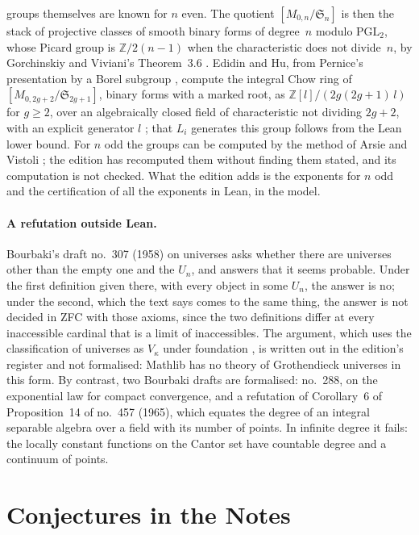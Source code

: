\documentclass[runningheads,a4paper]{llncs}
\begin{document}
groups themselves are known for $n$ even. The quotient $[M_{0,n}/\mathfrak S_n]$ is then the stack of projective classes of smooth binary forms of degree~$n$ modulo $\mathrm{PGL}_2$, whose Picard group is $\mathbb Z/2(n-1)$ when the characteristic does not divide~$n$, by Gorchinskiy and Viviani's Theorem~3.6 \cite{gorchinskiyviviani2008}. Edidin and Hu, from Pernice's presentation by a Borel subgroup \cite{pernice2022}, compute the integral Chow ring of $[M_{0,2g+2}/\mathfrak S_{2g+1}]$, binary forms with a marked root, as $\mathbb Z[l]/(2g(2g+1)\,l)$ for $g \geq 2$, over an algebraically closed field of characteristic not dividing $2g+2$, with an explicit generator $l$ \cite[Theorem~1.3]{edidinhu2025}; that $L_i$ generates this group follows from the Lean lower bound. For $n$ odd the groups can be computed by the method of Arsie and Vistoli \cite{arsievistoli2004}; the edition has recomputed them without finding them stated, and its computation is not checked. What the edition adds is the exponents for $n$ odd and the certification of all the exponents in Lean, in the model.

\paragraph{A refutation outside Lean.} Bourbaki's draft no.~307 (1958) on universes \cite{ahpbourbaki} asks whether there are universes other than the empty one and the $U_n$, and answers that it seems probable. Under the first definition given there, with every object in some $U_n$, the answer is no; under the second, which the text says comes to the same thing, the answer is not decided in ZFC with those axioms, since the two definitions differ at every inaccessible cardinal that is a limit of inaccessibles. The argument, which uses the classification of universes as $V_\kappa$ under foundation \cite{williams1969}, is written out in the edition's register and not formalised: Mathlib has no theory of Grothendieck universes in this form. By contrast, two Bourbaki drafts are formalised: no.~288, on the exponential law for compact convergence, and a refutation of Corollary~6 of Proposition~14 of no.~457 (1965), which equates the degree of an integral separable algebra over a field with its number of points. In infinite degree it fails: the locally constant functions on the Cantor set have countable degree and a continuum of points.

\section{Conjectures in the Notes}\label{sec:conj}
\end{document}

